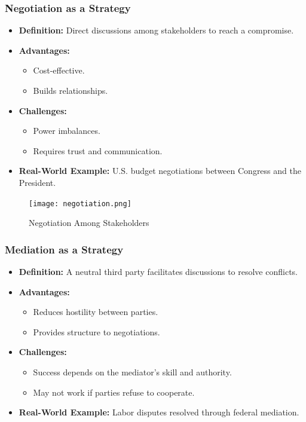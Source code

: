 \documentclass[10pt]{beamer}
\begin{document}
\begin{frame}
    \begin{frame}
    \frametitle{Negotiation as a Strategy}
    \begin{itemize}
        \item \textbf{Definition:} Direct discussions among stakeholders to reach a compromise.
        \item \textbf{Advantages:}
            \begin{itemize}
                \item Cost-effective.
                \item Builds relationships.
            \end{itemize}
        \item \textbf{Challenges:}
            \begin{itemize}
                \item Power imbalances.
                \item Requires trust and communication.
            \end{itemize}
        \item \textbf{Real-World Example:} U.S. budget negotiations between Congress and the President.
    \end{itemize}
    
    \begin{figure}
        \centering
        \texttt{[image: negotiation.png]}
        \caption{Negotiation Among Stakeholders}
    \end{figure}
    \end{frame}

    \begin{frame}
        \frametitle{Mediation as a Strategy}
        \begin{itemize}
            \item \textbf{Definition:} A neutral third party facilitates discussions to resolve conflicts.
            \item \textbf{Advantages:}
                \begin{itemize}
                    \item Reduces hostility between parties.
                    \item Provides structure to negotiations.
                \end{itemize}
            \item \textbf{Challenges:}
                \begin{itemize}
                    \item Success depends on the mediator's skill and authority.
                    \item May not work if parties refuse to cooperate.
                \end{itemize}
            \item \textbf{Real-World Example:} Labor disputes resolved through federal mediation.
        \end{itemize}
        

\end{frame}
\end{frame}
\end{document}

